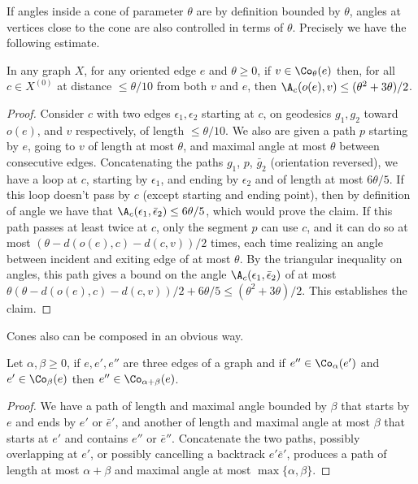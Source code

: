 If angles inside a cone of parameter $\theta$ are by definition bounded by $\theta$, angles at vertices close to the cone are also controlled in terms of $\theta$. Precisely we have the following estimate.

\begin{lemm}\label{lem;thetasquare}
In any graph $X$, for any oriented edge $e$ and $\theta\geq 0$, if $v\in \Co_\theta(e)$ then, for all $c\in X^{(0)}$ at distance $\leq
\theta/10$ from both $v$ and $e$, then $\A_c(o(e), v)\leq (\theta^2+3\theta)/2$.
\end{lemm}

\begin{proof}
Consider $c$ with two edges $\epsilon_1,
\epsilon_2$ starting at $c$, on geodesics $g_1, g_2$ toward $o(e)$, and $v$ respectively, of length $\leq \theta/10$. We also are given a path $p$ starting by $e$, going to $v$ of length at most $\theta$, and maximal angle at most $\theta$ between consecutive edges. Concatenating the paths $g_1$, $p$, $\bar g_2$ (orientation reversed), we have a loop at $c$, starting by $\epsilon_1$, and ending by $\epsilon_2$ and of length at most $6\theta/5$. If this loop doesn't pass by $c$ (except starting and ending point), then by definition of angle we have that $\A_c(
\epsilon_1, \bar \epsilon_2) \leq 6\theta/5$, which would prove the claim. If this path passes at least twice at $c$, only the segment $p$ can use $c$, and it can do so at most $(\theta- d(o(e),c)- d(c,v))/{2}$ times, each time realizing an angle between incident and exiting edge of at most $\theta$. By the triangular inequality on angles, this path gives a bound on the angle $\A_c(\epsilon_1, \bar \epsilon_2)$ of at most $\theta(\theta- d(o(e),c)- d(c,v))/{2}+ 6\theta/5\leq (\theta^2+3\theta)/2$. This establishes the claim.
\end{proof}

Cones also can be composed in an obvious way.

\begin{prop}\label{prop;composition_of_cones}
Let $\alpha,\beta\geq 0$, if $e,e', e''$ are three edges of a graph and if $e''\in
\Co_\alpha(e')$ and $e'\in \Co_\beta(e)$ then $e''\in \Co_{\alpha+\beta}(e)$.
\end{prop}
\begin{proof}
We have a path of length and maximal angle bounded by $\beta$ that starts by $e$ and ends by $e'$ or $\bar e'$, and another of length and maximal angle at most $\beta$ that starts at $e'$ and contains $e''$ or $\bar e''$. Concatenate the two paths, possibly overlapping at $e'$, or possibly cancelling a backtrack $e'\bar e'$, produces a path of length at most $\alpha +\beta$ and maximal angle at most $\max \{\alpha, \beta\}$.
\end{proof}

